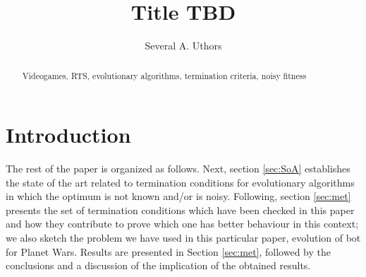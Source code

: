 \documentclass[runningheads,a4paper]{llncs}
\newcommand{\keywords}[1]{\par\addvspace\baselineskip
\noindent\keywordname\enspace\ignorespaces#1}
\begin{document}
\mainmatter  %

\title{Title TBD}


%
%
\author{Several A. Uthors}
%


%
%




\maketitle

%
%
\begin{abstract}
\keywords{Videogames, RTS, evolutionary algorithms, termination criteria, noisy fitness}
\end{abstract}

%
%
\section{Introduction}


The rest of the paper is organized as follows. Next, section \ref{sec:SoA} establishes the state of the art related to termination conditions for evolutionary algorithms in which the optimum is not known and/or is noisy. Following, section \ref{sec:met} presents the set of termination conditions which have been checked in this paper and how they contribute to prove which one has better behaviour in this context; we also sketch the problem we have used in this particular paper, evolution of bot for Planet Wars. Results are presented in Section \ref{sec:met}, followed by the conclusions and a discussion of the implication of the obtained results.
\end{document}
